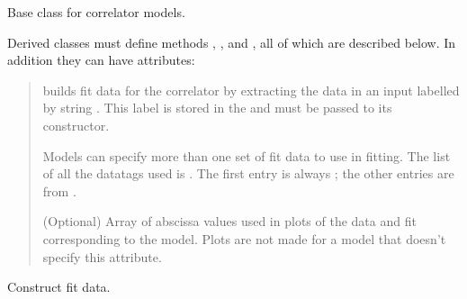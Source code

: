 \documentclass[letterpaper,10pt,english]{sphinxmanual}
\begin{document}

\begin{fulllineitems}
\label{corrfitter:corrfitter.BaseModel}
Base class for correlator models.

Derived classes must define methods , , and 
, all of which are described below. In addition they
can have attributes:
\begin{quote}

\begin{fulllineitems}
\label{corrfitter:BaseModel.datatag}
{\hyperref[corrfitter:corrfitter.CorrFitter]{}} builds fit data for the correlator by extracting the
data in an input  labelled by string . This
label is stored in the  and must be passed to its
constructor.

\end{fulllineitems}


\begin{fulllineitems}
\label{corrfitter:BaseModel.all_datatags}
Models can specify more than one set of fit data to use in fitting.
The list of all the datatags used is . The 
first entry is always ; the other entries are
from .

\end{fulllineitems}


\begin{fulllineitems}
\label{corrfitter:BaseModel._abscissa}
(Optional) Array of abscissa values used in plots of the data and
fit corresponding to the model. Plots are not made for a model that
doesn't specify this attribute.

\end{fulllineitems}

\end{quote}

\begin{fulllineitems}
\label{corrfitter:corrfitter.BaseModel.builddata}
Construct fit data.


\end{fulllineitems}
\end{fulllineitems}
\end{document}
